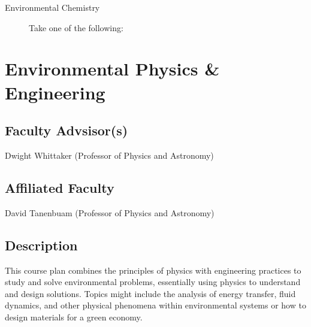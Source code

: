 \documentclass{article}\usepackage[]{graphicx}\usepackage[]{xcolor}
\newenvironment{itemize*}%
  {\begin{itemize}%
    \setlength{\itemsep}{0pt}%
    \setlength{\parskip}{0pt}}%
  {\end{itemize}}
\begin{document}
\begin{description}
\item[Environmental Chemistry] Take one of the following: 




\end{description}

\newpage %
\section{Environmental Physics \& Engineering}



\subsection{Faculty Advsisor(s)}

\begin{itemize*}
  \item Dwight Whittaker (Professor of Physics and Astronomy)
\end{itemize*}

\subsection{Affiliated Faculty}

\begin{itemize*}
  \item David Tanenbuam (Professor of Physics and Astronomy)
\end{itemize*}

\subsection{Description}

This course plan combines the principles of physics with engineering practices to study and solve environmental problems, essentially using physics to understand and design solutions. Topics might include the analysis of energy transfer, fluid dynamics, and other physical phenomena within environmental systems or how to design materials for a green economy. 
\end{document}
